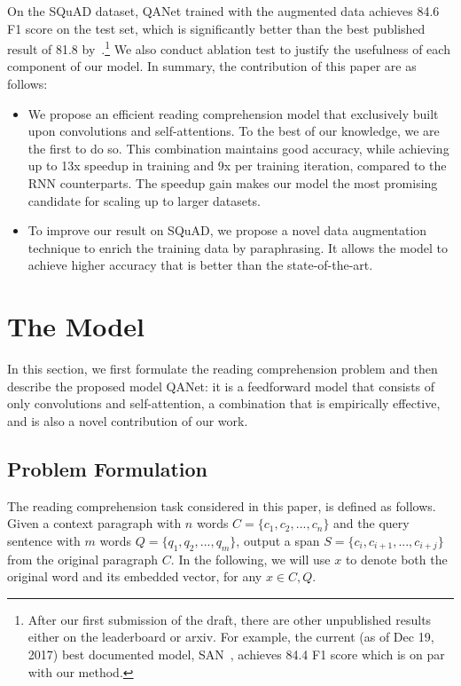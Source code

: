 \documentclass{article} \usepackage{iclr2018_conference,times}
\begin{document}
On the SQuAD dataset, QANet trained with the augmented data achieves 84.6 F1 score on the test set,
which is significantly better than the best published result of 81.8 by~\cite{HuPQ17}.\footnote{After our first submission of the draft, there are other unpublished results either on the leaderboard or arxiv. For example, the current (as of Dec 19, 2017) best documented model, SAN~\cite{Liu17}, achieves 84.4 F1 score which is on par with our method.} We also conduct ablation test to justify the usefulness of each component of our model. 
In summary, the contribution of this paper are as follows:
\begin{itemize}
\item We propose an efficient reading comprehension model that exclusively built upon convolutions and self-attentions. To the best of our knowledge, we are the first to do so. This combination maintains good accuracy, while achieving up to 13x speedup in training and 9x per training iteration, compared to the RNN counterparts. The speedup gain makes our model the most promising candidate for scaling up to larger datasets.
\item To improve our result on SQuAD, we propose a novel data augmentation technique to enrich the training data by paraphrasing. 
It allows the model to achieve higher accuracy that is better than the state-of-the-art.
\end{itemize}

%
 \section{The Model}\label{sec:model}
In this section, we first formulate the reading comprehension problem and then describe the proposed  model QANet: it is a feedforward model that consists of only convolutions and self-attention, a combination that is empirically effective, and is also a novel contribution of our work.

\subsection{Problem Formulation}
The reading comprehension task considered in this paper, is defined as follows. Given a context paragraph with $n$ words $C=\{c_1, c_2,..., c_n\}$ and the query sentence with $m$ words $Q=\{q_1, q_2,..., q_m\}$, output a span $S=\{c_{i}, c_{i+1},..., c_{i+j}\}$ from the original paragraph $C$. In the following, we will use $x$ to denote both the original word and its embedded vector, for any $x\in C, Q$.
\end{document}
